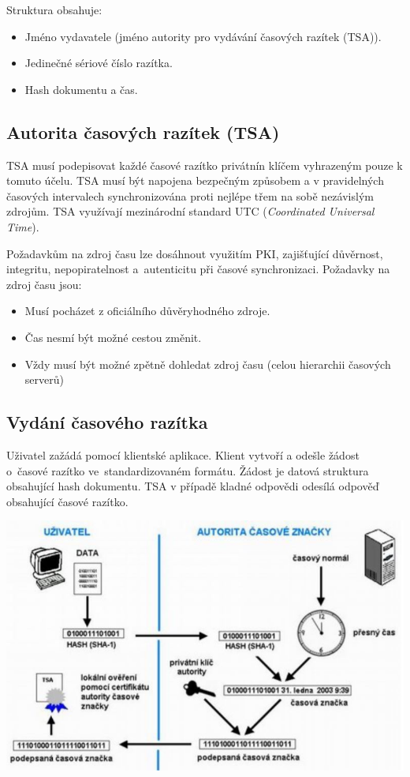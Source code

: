 \noindent Struktura obsahuje:
\begin{itemize}[noitemsep]
    \item Jméno vydavatele (jméno autority pro vydávání časových razítek (TSA)).
    \item Jedinečné sériové číslo razítka.
    \item Hash dokumentu a čas.
\end{itemize}

\subsection{Autorita časových razítek (TSA)}

TSA musí podepisovat každé časové razítko privátnín klíčem vyhrazeným pouze k tomuto účelu. TSA musí být napojena bezpečným způsobem a v pravidelných časových intervalech synchronizována proti nejlépe třem na sobě nezávislým zdrojům. TSA využívají mezinárodní standard UTC (\emph{Coordinated Universal Time}).

\noindent Požadavkům na zdroj času lze dosáhnout využitím PKI, zajišťující důvěrnost, integritu, nepopiratelnost a~autenticitu při časové synchronizaci. Požadavky na zdroj času jsou:

\begin{itemize}[noitemsep]
    \item Musí pocházet z oficiálního důvěryhodného zdroje.
    \item Čas nesmí být možné cestou změnit.
    \item Vždy musí být možné zpětně dohledat zdroj času (celou hierarchii časových serverů)
\end{itemize}

\subsection{Vydání časového razítka}

Uživatel zažádá pomocí klientské aplikace. Klient vytvoří a odešle žádost o~časové razítko ve~standardizovaném formátu. Žádost je datová struktura obsahující hash dokumentu. TSA v případě kladné odpovědi odesílá odpověď obsahující časové razítko.

\begin{center}
\includegraphics[scale=0.7]{images/Timestamp.jpg}
\end{center}

